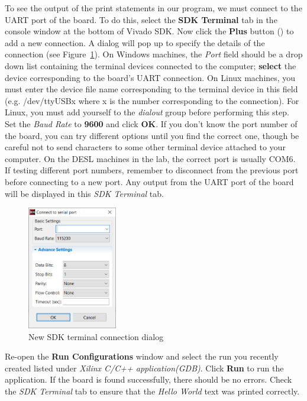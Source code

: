 \documentclass[11pt]{article}
\begin{document}
To see the output of the print statements in our program, we must connect to the UART port of the board. To do this, select the \textbf{SDK Terminal} tab in the console window at the bottom of Vivado SDK. Now click the \textbf{Plus} button 
()
to add a new connection. A dialog will pop up to specify the details of the connection (see Figure~\ref{fig:sdk_conn_dialog}). On Windows machines, the \textit{Port} field should be a drop down list containing the terminal devices connected to the computer; \textbf{select} the device corresponding to the board's UART connection. On Linux machines, you must enter the device file name corresponding to the terminal device in this field (e.g. /dev/ttyUSBx where x is the number corresponding to the connection). For Linux, you must add yourself to the \textit{dialout} group before performing this step. Set the \textit{Baud Rate} to \textbf{9600} and click \textbf{OK}. If you don't know the port number of the board, you can try different options until you find the correct one, though be careful not to send characters to some other terminal device attached to your computer. On the DESL machines in the lab, the correct port is usually COM6. If testing different port numbers, remember to disconnect from the previous port before connecting to a new port. Any output from the UART port of the board will be displayed in this \textit{SDK Terminal} tab.

\begin{figure}[h]
    \centering
    \includegraphics[width=0.35\textwidth]{images/sdk_conn_dialog.png}
    \caption{New SDK terminal connection dialog}
    \label{fig:sdk_conn_dialog}
\end{figure}

Re-open the \textbf{Run Configurations} window and select the run you recently created listed under \textit{Xilinx C/C++ application(GDB)}. Click \textbf{Run} to run the application. If the board is found successfully, there should be no errors. Check the \textit{SDK Terminal} tab to ensure that the \textit{Hello World} text was printed correctly.
\end{document}
